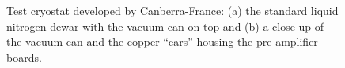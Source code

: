 \begin{figure}[tbhp] 
\centering 
{}\hfil%
%
\caption{Test cryostat developed by Canberra-France: (a) the standard liquid nitrogen dewar with the vacuum can on top and (b) a close-up of the vacuum can and the copper ``ears'' housing the pre-amplifier boards.}
\label{fig:tt:comcryo}
\end{figure}

